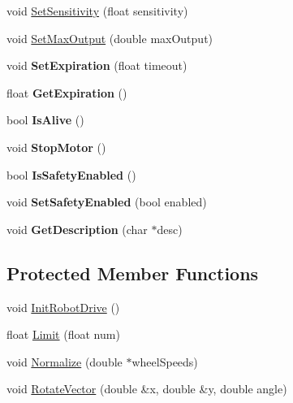 \begin{DoxyCompactItemize}
\item 
void \hyperlink{classRobotDrive_ae9838cbcf783b2eeca8ace11484ce79f}{SetSensitivity} (float sensitivity)
\item 
void \hyperlink{classRobotDrive_a6537ad67ea0306727bbf23a9b8d9b3a8}{SetMaxOutput} (double maxOutput)
\item 
\hypertarget{classRobotDrive_a6e3e5ca44b0806dec67c92abbe8cc27a}{
void {\bfseries SetExpiration} (float timeout)}
\label{classRobotDrive_a6e3e5ca44b0806dec67c92abbe8cc27a}

\item 
\hypertarget{classRobotDrive_a31926bfb77ba5cf767baaa5bbf350205}{
float {\bfseries GetExpiration} ()}
\label{classRobotDrive_a31926bfb77ba5cf767baaa5bbf350205}

\item 
\hypertarget{classRobotDrive_acd55b1b0117d425fcb73a4e8470fc5c1}{
bool {\bfseries IsAlive} ()}
\label{classRobotDrive_acd55b1b0117d425fcb73a4e8470fc5c1}

\item 
\hypertarget{classRobotDrive_a7768e45b579e742d21c279bf84d4613b}{
void {\bfseries StopMotor} ()}
\label{classRobotDrive_a7768e45b579e742d21c279bf84d4613b}

\item 
\hypertarget{classRobotDrive_a1bcceb2e547249492ad6776b6673c7d3}{
bool {\bfseries IsSafetyEnabled} ()}
\label{classRobotDrive_a1bcceb2e547249492ad6776b6673c7d3}

\item 
\hypertarget{classRobotDrive_a09817084c895e48104ff66454174c2af}{
void {\bfseries SetSafetyEnabled} (bool enabled)}
\label{classRobotDrive_a09817084c895e48104ff66454174c2af}

\item 
\hypertarget{classRobotDrive_a0ed67ac95f87cdb444674b706ff3cf19}{
void {\bfseries GetDescription} (char $\ast$desc)}
\label{classRobotDrive_a0ed67ac95f87cdb444674b706ff3cf19}

\end{DoxyCompactItemize}
\subsection*{Protected Member Functions}
\begin{DoxyCompactItemize}
\item 
void \hyperlink{classRobotDrive_ae57d5bb728428fac6cbd7eade67c569d}{InitRobotDrive} ()
\item 
float \hyperlink{classRobotDrive_aa7d99fd794c6f8c0b5486603f508a3a7}{Limit} (float num)
\item 
void \hyperlink{classRobotDrive_a5e6a645728f44664ee57e5fb4c02acc7}{Normalize} (double $\ast$wheelSpeeds)
\item 
void \hyperlink{classRobotDrive_af46d235e636cb5014bfbf525a2ecf247}{RotateVector} (double \&x, double \&y, double angle)
\end{DoxyCompactItemize}

